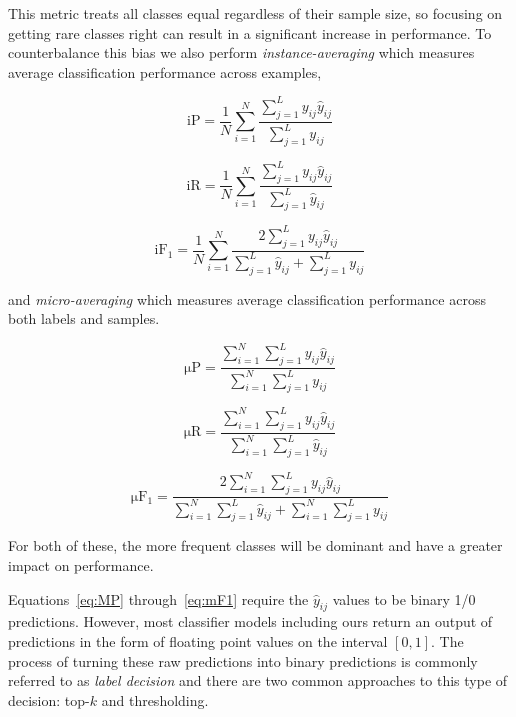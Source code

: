 \documentclass[12pt,journal,compsoc]{IEEEtran}
\begin{document}
This metric treats all classes equal regardless of their sample size, so focusing on getting rare classes right can result in a significant increase in performance. To counterbalance this bias we also perform \textit{instance-averaging} which measures average classification performance across examples,

\begin{equation}
\mathrm{iP} = \frac{1}{N}\sum_{i=1}^{N}\frac{\sum_{j=1}^{L}y_{ij}\hat{y}_{ij}}{\sum_{j=1}^{L}y_{ij}}
\label{eq:iP}
\end{equation}

\begin{equation}
\mathrm{iR} = \frac{1}{N}\sum_{i=1}^{N}\frac{\sum_{j=1}^{L}y_{ij}\hat{y}_{ij}}{\sum_{j=1}^{L}\hat{y}_{ij}}
\label{eq:iR}
\end{equation}

\begin{equation}
\mathrm{iF_1} = \frac{1}{N}\sum_{i=1}^{N}\frac{2\sum_{j=1}^{L}y_{ij}\hat{y}_{ij}}{\sum_{j=1}^{L}\hat{y}_{ij}+\sum_{j=1}^{L}y_{ij}}
\label{eq:iF1}
\end{equation}

and \textit{micro-averaging} which measures average classification performance across both labels and samples.

\begin{equation}
\mathrm{\mu P} = \frac{\sum_{i=1}^{N}\sum_{j=1}^{L}y_{ij}\hat{y}_{ij}}{\sum_{i=1}^{N}\sum_{j=1}^{L}y_{ij}}
\label{eq:mP}
\end{equation}

\begin{equation}
\mathrm{\mu R} = \frac{\sum_{i=1}^{N}\sum_{j=1}^{L}y_{ij}\hat{y}_{ij}}{\sum_{i=1}^{N}\sum_{j=1}^{L}\hat{y}_{ij}}
\label{eq:mR}
\end{equation}

\begin{equation}
\mathrm{\mu F_1} = \frac{2\sum_{i=1}^{N}\sum_{j=1}^{L}y_{ij}\hat{y}_{ij}}{\sum_{i=1}^{N}\sum_{j=1}^{L}\hat{y}_{ij}+\sum_{i=1}^{N}\sum_{j=1}^{L}y_{ij}}
\label{eq:mF1}
\end{equation}

For both of these, the more frequent classes will be dominant and have a greater impact on performance.

Equations~\ref{eq:MP} through~\ref{eq:mF1} require the $\hat{y}_{ij}$ values to be binary 1/0 predictions.  However, most classifier models including ours return an output of predictions in the form of floating point values on the interval $[0,1]$. The process of turning these raw predictions into binary predictions is commonly referred to as \textit{label decision} and there are two common approaches to this type of decision: top-$k$ and thresholding.~\cite{Li2017a}
\end{document}
